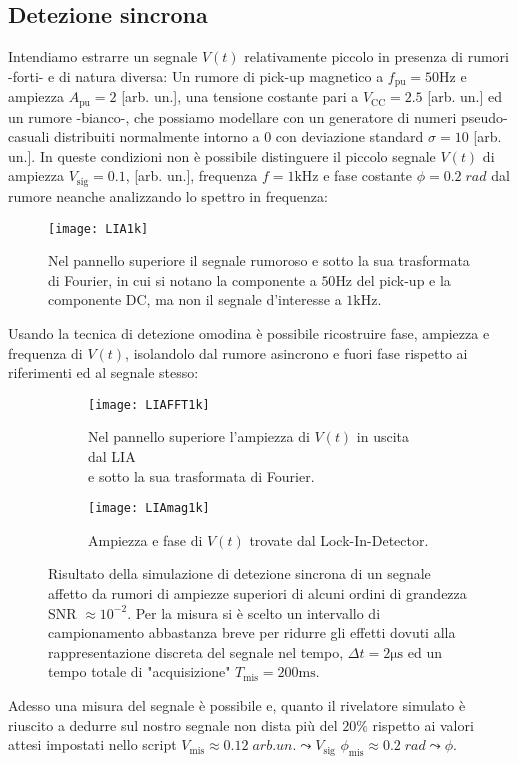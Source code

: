 \documentclass{article}[a4paper, oneside, 11pt]
\begin{document}
\subsection{Detezione sincrona}
Intendiamo estrarre un segnale $V(t)$ relativamente piccolo
in presenza di rumori -forti- e di natura diversa:
Un rumore di pick-up magnetico a $f_{\text{pu}} = 50 \si{\Hz}$ e ampiezza
$A_{\text{pu}} = 2$ [arb. un.], una tensione costante pari a 
$V_{\text{CC}} = 2.5$ [arb. un.] ed un rumore -bianco-, che possiamo modellare
con un generatore di numeri pseudo-casuali distribuiti normalmente
intorno a $0$ con deviazione standard $\sigma = 10$ [arb. un.].
In queste condizioni non è possibile distinguere il piccolo segnale $V(t)$ 
di ampiezza $V_{\text{sig}} = 0.1$, [arb. un.], frequenza 
$f = 1 \si{\kilo\hertz}$ e fase costante $\phi = 0.2 \; \si{rad}$
dal rumore neanche analizzando lo spettro in frequenza:
\begin{figure}[!htb]
\centering
	\texttt{[image: LIA1k]}
	\caption{Nel pannello superiore il segnale rumoroso e sotto la sua
			trasformata di Fourier, in cui si notano la componente a
			$50 \si{\Hz}$ del pick-up e la componente DC, ma non il segnale
			d'interesse a $1 \si{\kilo\hertz}$. \label{fig: LIAnoise}}
\end{figure}
Usando la tecnica di detezione omodina è possibile ricostruire fase,
ampiezza e frequenza di $V(t)$, isolandolo dal rumore asincrono e fuori
fase rispetto ai riferimenti ed al segnale stesso:
\begin{figure}[!htb]
	\centering
	\begin{subfigure}{.5\textwidth}
		\texttt{[image: LIAFFT1k]}
		\caption{Nel pannello superiore l'ampiezza di $V(t)$ in uscita dal LIA \\
				\; e sotto la sua trasformata di Fourier.}
	\end{subfigure}%
	\begin{subfigure}{.5\textwidth}
		\texttt{[image: LIAmag1k]}
		\caption{Ampiezza e fase di $V(t)$ trovate dal Lock-In-Detector.}
	\end{subfigure}
	\caption{Risultato della simulazione di detezione sincrona di un segnale
			affetto da rumori di ampiezze superiori di alcuni ordini di
			grandezza SNR $\approx 10^{-2}$. Per la misura si è scelto un
			intervallo di campionamento abbastanza breve per ridurre
			gli effetti dovuti alla rappresentazione discreta del segnale
			nel tempo, $\Delta t = 2 \si{\us}$ ed un tempo totale di
			"acquisizione" $T_{\text{mis}} = 200 \si{\ms}$.
		\label{fig: LIAall}}
\end{figure}
Adesso una misura del segnale è possibile e, quanto il rivelatore simulato è
riuscito a dedurre sul nostro segnale non dista più del $20 \%$ rispetto ai
valori attesi impostati nello script $V_{\text{mis}} \approx 0.12 \;
\si{arb. un.} \leadsto V_{\text{sig}}$ $\phi_{\text{mis}} \approx 0.2 \;
\si{rad} \leadsto \phi$.
\end{document}
